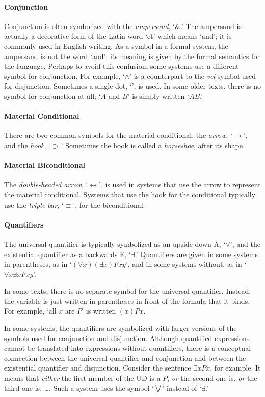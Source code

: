 \paragraph{Conjunction}
Conjunction is often symbolized with the \emph{ampersand}, `{\&}.' The ampersand is actually a decorative form of the Latin word `et' which means `and'; it is commonly used in English writing. As a symbol in a formal system, the ampersand is not the word `and'; its meaning is given by the formal semantics for the language. Perhaps to avoid this confusion, some systems use a different symbol for conjunction. For example, `$\wedge$' is a counterpart to the \emph{vel} symbol used for disjunction. Sometimes a single dot, `{\scriptsize\textbullet}', is used. In some older texts, there is no symbol for conjunction at all; `$A$ and $B$' is simply written `$AB$.'

\paragraph{Material Conditional} There are two common symbols for the material conditional: the \emph{arrow}, `$\rightarrow$', and the \emph{hook}, `$\supset$.' Sometimes the hook is called a \emph{horseshoe}, after its shape.

\paragraph{Material Biconditional} The \emph{double-headed arrow}, `$\leftrightarrow$', is used in systems that use the arrow to represent the material conditional. Systems that use the hook for the conditional typically use the \emph{triple bar}, `$\equiv$', for the biconditional.

\paragraph{Quantifiers} The universal quantifier is typically symbolized as an upside-down A, `$\forall$', and the existential quantifier as a backwards E, `$\exists$.' Quantifiers are given in some systems in parentheses, as in `$(\forall x)(\exists x)Fxy$', and in some systems without, as in `$\forall x\exists x Fxy$'.

In some texts, there is no separate symbol for the universal quantifier. Instead, the variable is just written in parentheses in front of the formula that it binds. For example, `all $x$ are $P$' is written $(x)Px$.

In some systems, the quantifiers are symbolized with larger versions of the symbols used for conjunction and disjunction. Although quantified expressions cannot be translated into expressions without quantifiers, there is a conceptual connection between the universal quantifier and conjunction and between the existential quantifier and disjunction. Consider the sentence $\exists x Px$, for example. It means that \emph{either} the first member of the UD is a $P$, \emph{or} the second one is, \emph{or} the third one is, {\ldots}. Such a system uses the symbol `$\bigvee$' instead of `$\exists$.'




